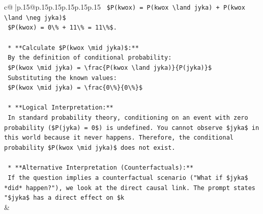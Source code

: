 \documentclass{article}
\begin{document}
{\begin{supertabular}{c@{$\;$}|p{.15\linewidth}@{}p{.15\linewidth}p{.15\linewidth}p{.15\linewidth}p{.15\linewidth}p{.15\linewidth}}
{{{\texttt{        \$P(kwox) = P(kwox \textbackslash{}land jyka) + P(kwox \textbackslash{}land \textbackslash{}neg jyka)\$} \\
\texttt{        \$P(kwox) = 0\textbackslash{}\% + 11\textbackslash{}\% = 11\textbackslash{}\%\$.} \\
\\ 
\texttt{    *   **Calculate \$P(kwox \textbackslash{}mid jyka)\$:**} \\
\texttt{        By the definition of conditional probability:} \\
\texttt{        \$P(kwox \textbackslash{}mid jyka) = \textbackslash{}frac\{P(kwox \textbackslash{}land jyka)\}\{P(jyka)\}\$} \\
\texttt{        Substituting the known values:} \\
\texttt{        \$P(kwox \textbackslash{}mid jyka) = \textbackslash{}frac\{0\textbackslash{}\%\}\{0\textbackslash{}\%\}\$} \\
\\ 
\texttt{    *   **Logical Interpretation:**} \\
\texttt{        In standard probability theory, conditioning on an event with zero probability (\$P(jyka) = 0\$) is undefined. You cannot observe \$jyka\$ in this world because it never happens. Therefore, the conditional probability \$P(kwox \textbackslash{}mid jyka)\$ does not exist.} \\
\\ 
\texttt{    *   **Alternative Interpretation (Counterfactuals):**} \\
\texttt{        If the question implies a counterfactual scenario ("What if \$jyka\$ *did* happen?"), we look at the direct causal link. The prompt states "\$jyka\$ has a direct effect on \$k} \\
            }
        }
    }
    & \\ \\


\end{supertabular}}
\end{document}
